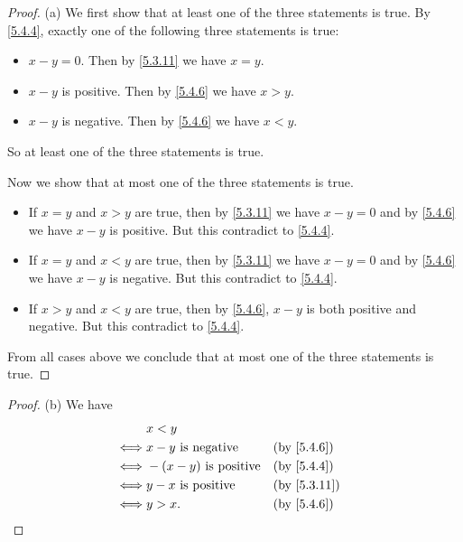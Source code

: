 \begin{proof}{(a)}
  We first show that at least one of the three statements is true.
  By \cref{5.4.4}, exactly one of the following three statements is true:
  \begin{itemize}
    \item \(x - y = 0\).
          Then by \cref{5.3.11} we have \(x = y\).
    \item \(x - y\) is positive.
          Then by \cref{5.4.6} we have \(x > y\).
    \item \(x - y\) is negative.
          Then by \cref{5.4.6} we have \(x < y\).
  \end{itemize}
  So at least one of the three statements is true.

  Now we show that at most one of the three statements is true.
  \begin{itemize}
    \item If \(x = y\) and \(x > y\) are true, then by \cref{5.3.11} we have \(x - y = 0\) and by \cref{5.4.6} we have \(x - y\) is positive.
          But this contradict to \cref{5.4.4}.
    \item If \(x = y\) and \(x < y\) are true, then by \cref{5.3.11} we have \(x - y = 0\) and by \cref{5.4.6} we have \(x - y\) is negative.
          But this contradict to \cref{5.4.4}.
    \item If \(x > y\) and \(x < y\) are true, then by \cref{5.4.6}, \(x - y\) is both positive and negative.
          But this contradict to \cref{5.4.4}.
  \end{itemize}
  From all cases above we conclude that at most one of the three statements is true.
\end{proof}

\begin{proof}{(b)}
  We have
  \begin{align*}
         & x < y                                                       \\
    \iff & x - y \text{ is negative}    &  & \text{(by \cref{5.4.6})}  \\
    \iff & -(x - y) \text{ is positive} &  & \text{(by \cref{5.4.4})}  \\
    \iff & y - x \text{ is positive}    &  & \text{(by \cref{5.3.11})} \\
    \iff & y > x.                       &  & \text{(by \cref{5.4.6})}
  \end{align*}
\end{proof}

